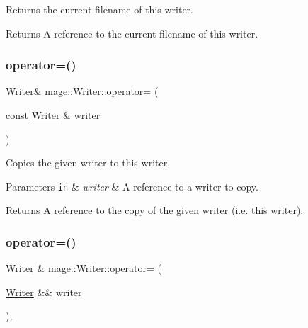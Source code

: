 Returns the current filename of this writer.

\begin{DoxyReturn}{Returns}
A reference to the current filename of this writer. 
\end{DoxyReturn}
\hypertarget{classmage_1_1_writer_a81ea888d1b170515713432ca28629ceb}{}\label{classmage_1_1_writer_a81ea888d1b170515713432ca28629ceb} 
\subsubsection{\texorpdfstring{operator=()}{operator=()}\hspace{0.1cm}{\footnotesize\ttfamily [1/2]}}
{\footnotesize\ttfamily \hyperlink{classmage_1_1_writer}{Writer}\& mage\+::\+Writer\+::operator= (\begin{DoxyParamCaption}\item[{const \hyperlink{classmage_1_1_writer}{Writer} \&}]{writer }\end{DoxyParamCaption})\hspace{0.3cm}{\ttfamily [delete]}}

Copies the given writer to this writer.


\begin{DoxyParams}[1]{Parameters}
\mbox{\tt in}  & {\em writer} & A reference to a writer to copy. \\
\hline
\end{DoxyParams}
\begin{DoxyReturn}{Returns}
A reference to the copy of the given writer (i.\+e. this writer). 
\end{DoxyReturn}
\hypertarget{classmage_1_1_writer_a03a93796179f22be90471bea0f7a7cf0}{}\label{classmage_1_1_writer_a03a93796179f22be90471bea0f7a7cf0} 
\subsubsection{\texorpdfstring{operator=()}{operator=()}\hspace{0.1cm}{\footnotesize\ttfamily [2/2]}}
{\footnotesize\ttfamily \hyperlink{classmage_1_1_writer}{Writer} \& mage\+::\+Writer\+::operator= (\begin{DoxyParamCaption}\item[{\hyperlink{classmage_1_1_writer}{Writer} \&\&}]{writer }\end{DoxyParamCaption})\hspace{0.3cm}{\ttfamily [default]}, {\ttfamily [noexcept]}}

